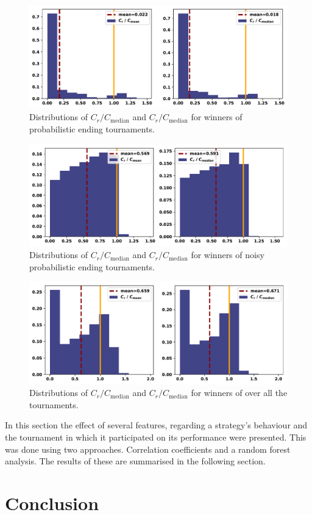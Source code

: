 \documentclass{article}
\begin{document}
\begin{figure}[!htbp]
    \centering
    \includegraphics[width=.5\textwidth]{../images/compared_to_mean_median_probend.pdf}
    \caption{Distributions of \(C_r / C_{\text{median}}\)
    and \(C_r / C_{\text{median}}\) for winners of probabilistic ending tournaments.}\label{fig:mean_median_probend}
\end{figure}

\begin{figure}[!htbp]
    \centering
    \includegraphics[width=.5\textwidth]{../images/compared_to_mean_median_probend_noisy.pdf}
    \caption{Distributions of \(C_r / C_{\text{median}}\)
    and \(C_r / C_{\text{median}}\) for winners of noisy probabilistic ending tournaments.}\label{fig:mean_median_probend_noisy}
\end{figure}

\begin{figure}[!htbp]
    \centering
    \includegraphics[width=.5\textwidth]{../images/compared_to_mean_median_overall.pdf}
    \caption{Distributions of \(C_r / C_{\text{median}}\)
    and \(C_r / C_{\text{median}}\) for winners of over all the tournaments.}\label{fig:mean_median_overall}
\end{figure}

In this section the effect of several features, regarding a strategy's behaviour
and the tournament in which it participated on its performance were presented.
This was done using two approaches. Correlation coefficients and a random forest
analysis. The results of these are summarised in the following section.

\section{Conclusion}\label{section:conclusion}
\end{document}
